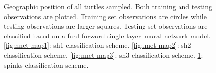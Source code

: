 \documentclass{article}\usepackage{graphicx, color}
\makeatletter
\newenvironment{kframe}{%
 \def\at@end@of@kframe{}%
 \ifinner\ifhmode%
  \def\at@end@of@kframe{\end{minipage}}%
  \begin{minipage}{\columnwidth}%
 \fi\fi%
 \def\FrameCommand##1{\hskip\@totalleftmargin \hskip-\fboxsep
 \colorbox{shadecolor}{##1}\hskip-\fboxsep
     \hskip-\linewidth \hskip-\@totalleftmargin \hskip\columnwidth}%
 \MakeFramed {\advance\hsize-\width
   \@totalleftmargin\z@ \linewidth\hsize
   \@setminipage}}%
 {\par\unskip\endMakeFramed%
 \at@end@of@kframe}
\newenvironment{knitrout}{}{} %
\makeatother
\begin{document}
\begin{figure}[t]
\begin{subfigure}[b]{0.5\textwidth}
    \label{fig:nnet-map4}
  \end{subfigure}
  \caption{Geographic position of all turtles sampled. Both training and testing observations are plotted. Training set observations are circles while testing observations are larger squares. Testing set observations are classified based on a feed-forward single layer neural network model. \ref{fig:nnet-map1}: sh1 classification scheme. \ref{fig:nnet-map2}: sh2 classification scheme. \ref{fig:nnet-map3}: sh3 classification scheme. \ref{fig:nnet-map4}: spinks classification scheme.}
  \label{fig:nnet-map}
\end{figure}


\begin{knitrout}
\color{fgcolor}\begin{kframe}


{\ttfamily\noindent\bfseries\color{errorcolor}{\#\# Error: object 'trf.class' not found}}

{\ttfamily\noindent\bfseries\color{errorcolor}{\#\# Error: object 'turtle.train' not found}}

{\ttfamily\noindent\bfseries\color{errorcolor}{\#\# Error: object 'trf.map' not found}}\end{kframe}
\end{knitrout}
\end{document}
